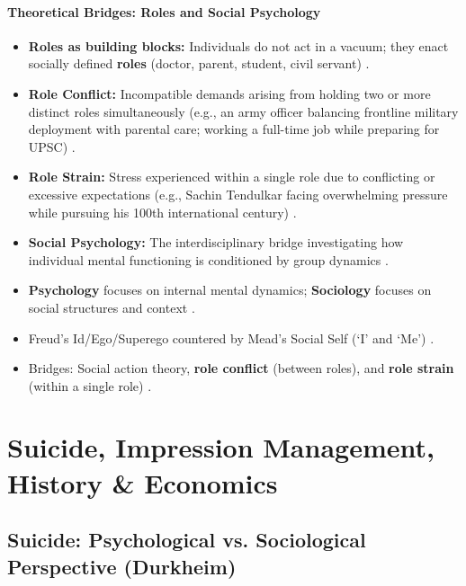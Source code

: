 \paragraph{Theoretical Bridges: Roles and Social Psychology}
\begin{KeyConcept}
\begin{itemize}
    \item \textbf{Roles as building blocks:} Individuals do not act in a vacuum; they enact socially defined \textbf{roles} (doctor, parent, student, civil servant) .
    \item \textbf{Role Conflict:} Incompatible demands arising from holding two or more distinct roles simultaneously (e.g., an army officer balancing frontline military deployment with parental care; working a full-time job while preparing for UPSC) .
    \item \textbf{Role Strain:} Stress experienced within a single role due to conflicting or excessive expectations (e.g., Sachin Tendulkar facing overwhelming pressure while pursuing his 100th international century) .
    \item \textbf{Social Psychology:} The interdisciplinary bridge investigating how individual mental functioning is conditioned by group dynamics .
\end{itemize}
\end{KeyConcept}

\begin{QuickRevision}
\begin{itemize}
    \item \textbf{Psychology} focuses on internal mental dynamics; \textbf{Sociology} focuses on social structures and context .
    \item Freud's Id/Ego/Superego countered by Mead's Social Self (`I' and `Me') .
    \item Bridges: Social action theory, \textbf{role conflict} (between roles), and \textbf{role strain} (within a single role) .
\end{itemize}
\end{QuickRevision}

\sectiondivider

\section{Suicide, Impression Management, History \& Economics}

\subsection{Suicide: Psychological vs. Sociological Perspective (Durkheim)}

